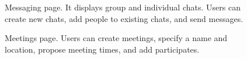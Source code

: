 \documentclass[12pt]{article}
\begin{document}
\begin{figure}[H]
\centering
{}
\caption*{\footnotesize Messaging page. It displays group and individual chats. Users can create new chats, add people to existing chats, and send messages.}
\end{figure}

\begin{figure}[H]
\centering
{}
\caption*{\footnotesize Meetings page. Users can create meetings, specify a name and location, propose meeting times, and add participates.}
\end{figure}
\end{document}
